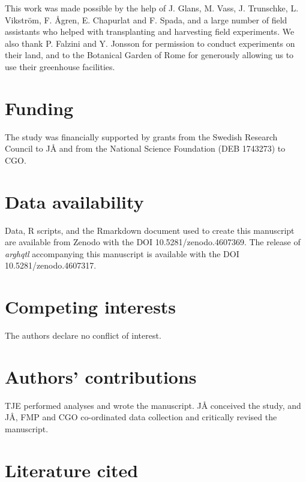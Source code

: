 \documentclass[
]{article}
\begin{document}
This work was made possible by the help of J. Glans, M. Vass, J. Trunschke, L. Vikström, F. Ågren, E. Chapurlat and F. Spada, and a large number of field assistants who helped with transplanting and harvesting field experiments. We also thank P. Falzini and Y. Jonsson for permission to conduct experiments on their land, and to the Botanical Garden of Rome for generously allowing us to use their greenhouse facilities.

\hypertarget{funding}{%
\section{Funding}\label{funding}}

The study was financially supported by grants from the Swedish Research Council to JÅ and from the National Science Foundation (DEB 1743273) to CGO.

\hypertarget{data-availability}{%
\section{Data availability}\label{data-availability}}

Data, R scripts, and the Rmarkdown document used to create this manuscript are available from Zenodo with the DOI 10.5281/zenodo.4607369. The release of \emph{arghqtl} accompanying this manuscript is available with the DOI 10.5281/zenodo.4607317.

\hypertarget{competing-interests}{%
\section{Competing interests}\label{competing-interests}}

The authors declare no conflict of interest.

\hypertarget{authors-contributions}{%
\section{Authors' contributions}\label{authors-contributions}}

TJE performed analyses and wrote the manuscript. JÅ conceived the study, and JÅ, FMP and CGO co-ordinated data collection and critically revised the manuscript.

\hypertarget{literature-cited}{%
\section{Literature cited}\label{literature-cited}}
\end{document}
